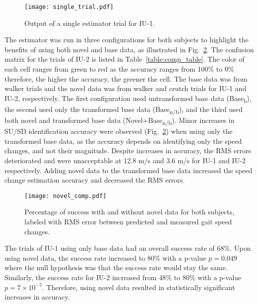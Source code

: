 \begin{figure}
	\centering
	\texttt{[image: single\_trial.pdf]}
	\caption{Output of a single estimator trial for IU-1.}\label{fig:single_trial}
\end{figure}

The  estimator was run in three configurations for both subjects to highlight the benefits of using both novel and base data, as illustrated in Fig.~\ref{fig:novel_comp}. The confusion matrix for the trials of IU-2 is listed in Table~\ref{table:comp_table}. The color of each cell ranges from green to red as the accuracy ranges from 100\% to 0\% therefore, the higher the accuracy, the greener the cell. The base data was from walker trials and the novel data was from walker and crutch trials for IU-1 and IU-2, respectively. The first configuration used untransformed base data (Base\textsubscript{b}), the second used only the transformed base data (Base\textsubscript{n/b}), and the third used both novel and transformed base data (Novel+Base\textsubscript{n/b}). Minor increases in SU/SD identification accuracy were observed (Fig.~\ref{fig:novel_comp}) when using only the transformed base data, as the accuracy depends on identifying only the speed changes, and not their magnitude. Despite increases in accuracy, the RMS errors deteriorated and were unacceptable at 12.8 m/s and 3.6 m/s for IU-1 and IU-2 respectively. Adding novel data to the transformed base data increased the speed change estimation accuracy and decreased the RMS errors. 

\begin{figure}
	\centering
	\texttt{[image: novel\_comp.pdf]}
	\caption{Percentage of success with and without novel data for both subjects, labeled with RMS error between predicted and measured gait speed changes.}\label{fig:novel_comp}
\end{figure}

\begin{table}
	\centering
	\caption{Confusion matrix for IU-2 \\ For estimation with and without novel data }\label{table:comp_table}
	
\end{table}

The trials of IU-1 using only base data had an overall success rate of 68\%. Upon using novel data, the success rate increased to 80\% with a p-value $ p = 0.049$ where the null hypothesis was that the success rate would stay the same. Similarly, the success rate for IU-2 increased from 48\% to 80\% with a p-value $ p = 7\times10^{-5} $. Therefore, using novel data resulted in statistically significant increases in accuracy.


